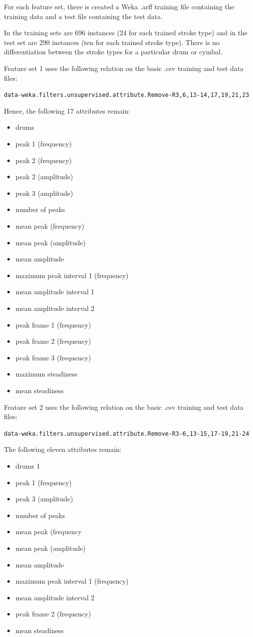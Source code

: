 \newpage
For each feature set, there is created a Weka .arff training file containing the training data and a test file containing the test data.

In the training sets are 696 instances (24 for each trained stroke type) and in the test set are 290 instances (ten for each trained stroke type). There is no differentiation between the stroke types for a particular drum or cymbal.

Feature set 1 uses the following relation on the basic .csv training and test data files:

\lstinline{data-weka.filters.unsupervised.attribute.Remove-R3,6,13-14,17,19,21,23}

Hence, the following 17 attributes remain:

\begin{itemize} 
	\item drums
	\item peak 1 (frequency)
	\item peak 2 (frequency)
	\item peak 2 (amplitude)
	\item peak 3 (amplitude)
	\item number of peaks
	\item mean peak (frequency)
	\item mean peak (amplitude)
	\item mean amplitude
	\item maximum peak interval 1 (frequency)
	\item mean amplitude interval 1
	\item mean amplitude interval 2
	\item peak frame 1 (frequency)
	\item peak frame 2 (frequency)
	\item peak frame 3 (frequency)
	\item maximum steadiness
	\item mean steadiness	
\end{itemize}

Feature set 2 uses the following relation on the basic .csv training and test data files:

\lstinline{data-weka.filters.unsupervised.attribute.Remove-R3-6,13-15,17-19,21-24}

The following eleven attributes remain:

\begin{itemize} 
	\item drums 1
	\item peak 1 (frequency)
	\item peak 3 (amplitude)
	\item number of peaks
	\item mean peak (frequency
	\item mean peak (amplitude)
	\item mean amplitude
	\item maximum peak interval 1 (frequency)
	\item mean amplitude interval 2
	\item peak frame 2 (frequency)
	\item mean steadiness	
\end{itemize}

